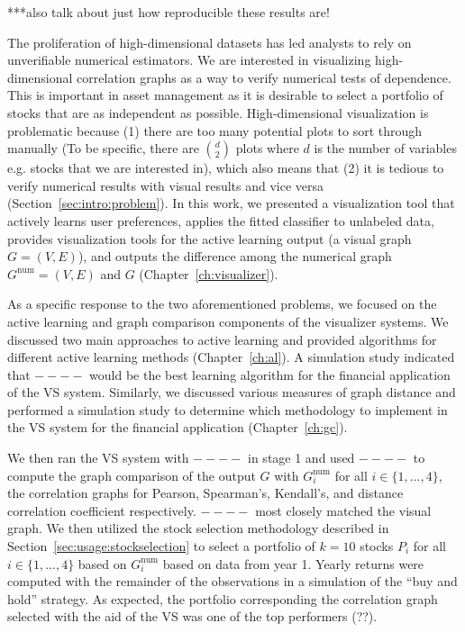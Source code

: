 
***also talk about just how reproducible these results are!

The proliferation of high-dimensional datasets has led analysts to rely on 
unverifiable numerical estimators. We are interested in visualizing 
high-dimensional correlation 
graphs as a way to verify numerical tests of dependence. This is important in 
asset management as it is desirable to select a portfolio of stocks that are as 
independent as possible. High-dimensional visualization is problematic because 
(1) there are too many potential plots to sort through manually (To be 
specific, there are $d\choose 2$  plots where $d$ is the number of variables 
e.g. stocks that we are interested in), which also means that (2) it is tedious 
to verify numerical results with visual results and vice versa 
(Section~\ref{sec:intro:problem}). In this work, we 
presented a visualization tool that actively learns user preferences, applies 
the fitted classifier to unlabeled data, provides visualization tools for the 
active learning output (a visual graph $G=(V,E)$), and outputs the difference 
among the numerical graph $G^{\text{num}}=(V,E)$ and $G$ 
(Chapter~\ref{ch:visualizer}).

As a specific response to the two aforementioned problems, we focused on the 
active learning and graph comparison components of the visualizer systems. We 
discussed two main approaches to active learning and provided algorithms for 
different active learning methods (Chapter~\ref{ch:al}). A simulation study 
indicated that $----$ would be the best learning algorithm for the 
financial application of the VS system. Similarly, we discussed various 
measures of graph distance and performed a simulation study to determine which 
methodology to implement in the VS system for the financial application 
(Chapter~\ref{ch:gc}). 

We then ran the VS system with $----$ in stage 1 and 
used $----$ to compute the graph comparison of the output $G$ with 
$G_i^{\text{num}}$ for all $i \in \{1,...,4\}$, the correlation graphs for 
Pearson, Spearman's, Kendall's, and distance correlation coefficient 
respectively. $----$ most closely matched the visual graph. We then utilized 
the stock selection methodology described in 
Section~\ref{sec:usage:stockselection} to select a portfolio of $k = 10$ stocks 
$P_i$ for all $i \in \{1,...,4\}$ based on $G_i^{\text{num}}$ based on data 
from year 1. Yearly returns were computed with the remainder of the 
observations in a simulation of the ``buy and hold'' strategy. As expected, the 
portfolio corresponding the correlation graph selected with the aid of the VS 
was one of the top performers (??).

